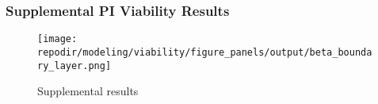 \clearpage

\subsubsection{Supplemental PI Viability Results}

\begin{figure}
\centering
\texttt{[image: \\repodir/modeling/viability/figure\_panels/output/beta\_boundary\_layer.png]}
\caption{Supplemental results}
\end{figure}
